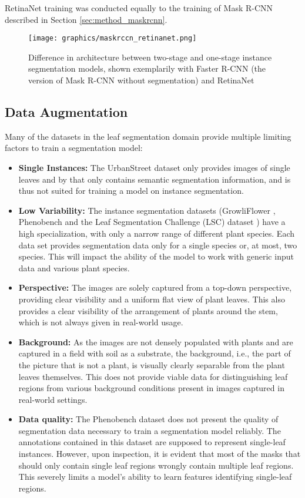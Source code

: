 \documentclass[draft,final]{vutinfth} %
\begin{document}
RetinaNet training was conducted equally to the training of Mask R-CNN described in Section \ref{sec:method_maskrcnn}.

\begin{figure}[h]
    \centering
    \texttt{[image: graphics/maskrccn\_retinanet.png]}
    \caption{Difference in architecture between two-stage and one-stage instance segmentation models, shown exemplarily with Faster R-CNN (the version of Mask R-CNN without segmentation) and RetinaNet \cite{carranza-garcia_performance_2021}}
    \label{fig:maskrcnn_retinanet_arch}
\end{figure}

\subsection{Data Augmentation} \label{sec:data_aug}
Many of the datasets in the leaf segmentation domain provide multiple limiting factors to train a segmentation model:
\begin{itemize}
    \item \textbf{Single Instances:} The UrbanStreet dataset \cite{yang_urban_2023} only provides images of single leaves and by that only contains semantic segmentation information, and is thus not suited for training a model on instance segmentation.
    \item \textbf{Low Variability:} The instance segmentation datasets (GrowliFlower \cite{kierdorf_growliflower_2023}, Phenobench \cite{weyler_phenobench_2023} and the Leaf Segmentation Challenge (LSC) dataset \cite{minervini_finely-grained_2016}) have a high specialization, with only a narrow range of different plant species. Each data set provides segmentation data only for a single species or, at most, two species. This will impact the ability of the model to work with generic input data and various plant species.
    \item \textbf{Perspective:} The images are solely captured from a top-down perspective, providing clear visibility and a uniform flat view of plant leaves. This also provides a clear visibility of the arrangement of plants around the stem, which is not always given in real-world usage.
    \item \textbf{Background:} As the images are not densely populated with plants and are captured in a field with soil as a substrate, the background, i.e., the part of the picture that is not a plant, is visually clearly separable from the plant leaves themselves. This does not provide viable data for distinguishing leaf regions from various background conditions present in images captured in real-world settings.
    \item \textbf{Data quality:} The Phenobench dataset \cite{weyler_phenobench_2023} does not present the quality of segmentation data necessary to train a segmentation model reliably. The annotations contained in this dataset are supposed to represent single-leaf instances. However, upon inspection, it is evident that most of the masks that should only contain single leaf regions wrongly contain multiple leaf regions. This severely limits a model's ability to learn features identifying single-leaf regions.
\end{itemize}
\end{document}
